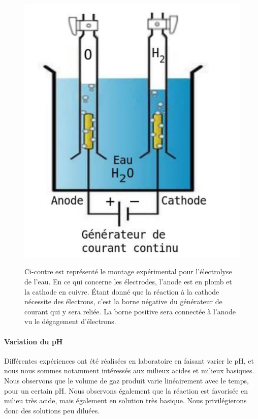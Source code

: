 \documentclass[10pt]{article}
\begin{document}
\begin{figure}[h!]
   \begin{minipage}[c]{.3\linewidth}
      \includegraphics[scale=0.45]{laboelectrolyse.png}
   \end{minipage} \hfill
   \begin{minipage}[c]{.46\linewidth}
      Ci-contre est représenté le montage expérimental pour l'électrolyse de l'eau. En ce qui concerne les 
      électrodes, l'anode est en plomb et la cathode en cuivre. Étant donné que la réaction à la cathode
      nécessite des électrons, c'est la borne négative du générateur de courant qui y sera reliée. La borne 
      positive sera connectée à l'anode vu le dégagement d'électrons.
   \end{minipage}
\end{figure}

\paragraph{Variation du pH}  Différentes expériences ont été réalisées en laboratoire en faisant varier le pH, et
nous nous sommes notamment intéressés aux milieux acides et milieux basiques. Nous observons que le volume de gaz
produit varie linéairement avec le temps, pour un certain pH. Nous observons également que la réaction est favorisée
en milieu très acide, mais également en solution très basique. Nous privilégierons donc des solutions peu diluées.
\end{document}
